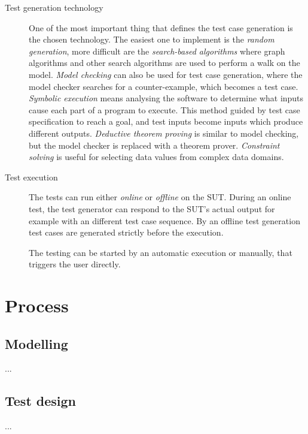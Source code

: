 \begin{description}
	\item[Test generation technology] One of the most important thing that defines the test case generation is the chosen technology. The easiest one to implement is the \textit{random generation}, more difficult are the \textit{search-based algorithms} where graph algorithms and other search algorithms are used to perform a walk on the model. \textit{Model checking} can also be used for test case generation, where the model checker searches for a counter-example, which becomes a test case. \textit{Symbolic execution} means analysing the software to determine what inputs cause each part of a program to execute. This method guided by test case specification to reach a goal, and test inputs become inputs which produce different outputs. \textit{Deductive theorem proving} is similar to model checking, but the model checker is replaced with a theorem prover. \textit{Constraint solving} is useful for selecting data values from complex data domains.
	
	\item[Test execution] The tests can run either \textit{online} or \textit{offline} on the SUT. During an online test, the test generator can respond to the SUT's actual output for example with an different test case sequence. By an offline test generation test cases are generated strictly before the execution.
	
	The testing can be started by an automatic execution or manually, that triggers the user directly.
\end{description}


\section{Process}
\label{sec:process}

\subsection{Modelling}
\label{sub:modelling}

...


\subsection{Test design}
\label{sub:testdesign}

...


